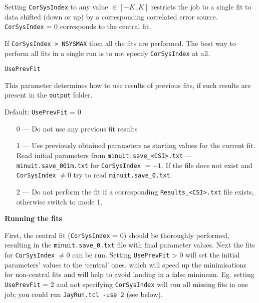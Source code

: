 Setting \verb'CorSysIndex' to any value $\in [-K, K]$ 
restricts the job to a single fit to data shifted (down or up) by a corresponding
correlated error source.
\verb'CorSysIndex' = 0 corresponds to the central fit.

If \verb'CorSysIndex > NSYSMAX' then all the fits are performed.
The best way to perform all fits in a single run is 
to not specify \verb'CorSysIndex' at all.
\vspace{0.4cm}

{\tt UsePrevFit}

This parameter determines how to use results of previous fits,
if such results are present in the \verb'output' folder.

Default: \verb'UsePrevFit' = 0

\begin{enumerate}
\item [0 ---]
Do not use any previous fit results
\item [1 ---]
Use previously obtained parameters as starting values for the current fit.
Read initial parameters from \verb'minuit.save_<CSI>.txt'
 --- \eg  \verb'minuit.save_001m.txt' for \verb'CorSysIndex' $= -1$.
If the file does not exist and \verb'CorSysIndex' $\neq 0$ try to read
\verb'minuit.save_0.txt'.
\item [2 ---]
Do not perform the fit if a corresponding \verb'Results_<CSI>.txt' file exists,
otherwise switch to mode 1.
\end{enumerate}
\vspace{0.4cm}

{\bf {Running the fits}}

First, the central fit (\verb'CorSysIndex' = 0) should be thoroughly performed,
resulting in the \verb'minuit.save_0.txt' file with final parameter values.
Next the fits for \verb'CorSysIndex' $\neq 0$
can be run. Setting \verb'UsePrevFit' > 0 will set the initial parameters' values to the `central' ones,
which will speed up the minimisations for non-central fits
and will help to avoid landing in a false minimum.
Eg. setting \verb'UsePrevFit' = 2 and not specifying \verb'CorSysIndex' 
will run all missing fits in one job;
you could run \verb'JayRun.tcl -use 2' (see below).



